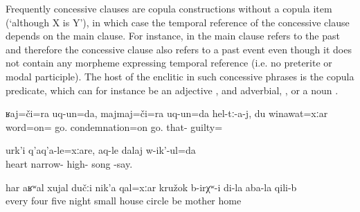 Frequently concessive clauses are copula constructions without a copula item (`although X is Y'), in which case the temporal reference of the concessive clause depends on the main clause. For instance, in  the main clause refers to the past and therefore the concessive clause also refers to a past event even though it does not contain any morpheme expressing temporal reference (i.e. no preterite or modal participle). The host of the enclitic in such concessive phrases is the copula predicate, which can for instance be an adjective , and adverbial, , or a noun . 

\begin{exe}
		\ex	\label{ex:‎‎I argued, I quarreled with them, though I was guilty (myself).}
	\gll	ʁaj=či=ra	uq-un=da, majmaj=či=ra	uq-un=da	hel-tː-a-j,	du	winawat=xːar \\
word=on=	go.		condemnation=on	go.	that-		guilty= \\
	\glt	{}
	
	\ex	\label{ex:‎‎Even though the heart is sorrowful (lit. `narrowly'), I sing my song loudly.}
	\gll	urk'i	q'aq'a-le=xːare,		aq-le	dalaj	w-ik'-ul=da \\
heart	narrow-		high-	song	-say.\\
	\glt	{}
	
			\ex	\label{ex:‎‎‎Every fourth or fifth night there was a circle (of people) in my mother's house though it was a small house}
	\gll	har	aʁʷal	xujal	dučːi	nik'a	qal=xːar	kružok	b-irχʷ-i	di-la	aba-la	qili-b\\
		every	four	five	night	small	house	circle	be		mother	home\\
	\glt	{}
\end{exe}

